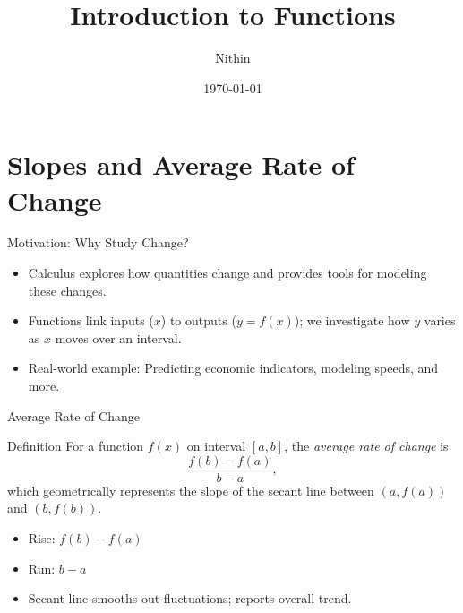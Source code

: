 \documentclass{beamer}
\title{Introduction to Functions}
\author{Nithin}
\institute{}
\date{\today}
\begin{document}
\begin{frame}
  \titlepage
\end{frame}
\begin{frame}
  \tableofcontents
\end{frame}
\section{Slopes and Average Rate of Change}

\begin{frame}{Motivation: Why Study Change?}
  \begin{itemize}
    \item Calculus explores how quantities change and provides tools for modeling these changes.
    \item Functions link inputs ($x$) to outputs ($y=f(x)$); we investigate how $y$ varies as $x$ moves over an interval.
    \item Real-world example: Predicting economic indicators, modeling speeds, and more.
  \end{itemize}
\end{frame}

\begin{frame}{Average Rate of Change}
  \begin{block}{Definition}
    For a function $f(x)$ on interval $[a,b]$, the \emph{average rate of change} is
    \[ 
      \frac{f(b)-f(a)}{b-a},
    \]
    which geometrically represents the slope of the secant line between $(a,f(a))$ and $(b,f(b))$.
  \end{block}
  \begin{itemize}
    \item Rise: $f(b)-f(a)$
    \item Run: $b-a$
    \item Secant line smooths out fluctuations; reports overall trend.
  \end{itemize}
\end{frame}
\end{document}
